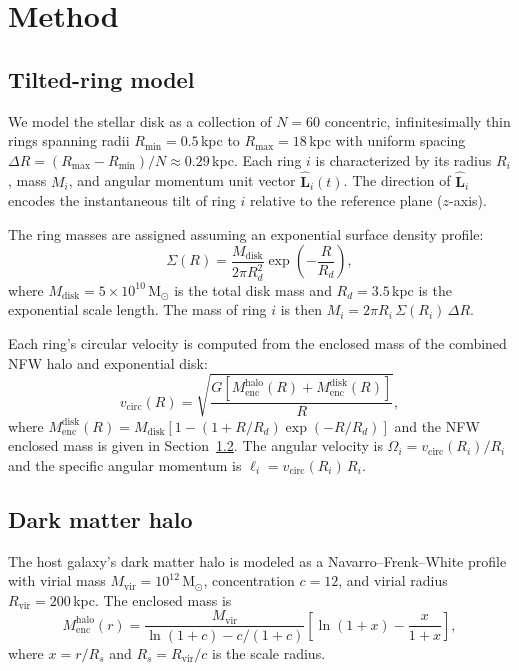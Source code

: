 \section{Method}
\label{sec:method}

\subsection{Tilted-ring model}
\label{sec:ring_model}

We model the stellar disk as a collection of $N=60$ concentric, infinitesimally thin rings spanning radii $R_\mathrm{min}=0.5$\,kpc to $R_\mathrm{max}=18$\,kpc with uniform spacing $\Delta R = (R_\mathrm{max}-R_\mathrm{min})/N \approx 0.29$\,kpc. Each ring $i$ is characterized by its radius $R_i$, mass $M_i$, and angular momentum unit vector $\hat{\boldsymbol{L}}_i(t)$. The direction of $\hat{\boldsymbol{L}}_i$ encodes the instantaneous tilt of ring $i$ relative to the reference plane ($z$-axis).

The ring masses are assigned assuming an exponential surface density profile:
\begin{equation}
    \Sigma(R) = \frac{M_\mathrm{disk}}{2\pi R_d^2} \exp\!\left(-\frac{R}{R_d}\right),
\end{equation}
where $M_\mathrm{disk}=5\times10^{10}\,\mathrm{M}_\odot$ is the total disk mass and $R_d=3.5$\,kpc is the exponential scale length. The mass of ring $i$ is then $M_i = 2\pi R_i \,\Sigma(R_i)\,\Delta R$.

Each ring's circular velocity is computed from the enclosed mass of the combined NFW halo and exponential disk:
\begin{equation}
    v_\mathrm{circ}(R) = \sqrt{\frac{G\left[M_\mathrm{enc}^\mathrm{halo}(R) + M_\mathrm{enc}^\mathrm{disk}(R)\right]}{R}},
\end{equation}
where $M_\mathrm{enc}^\mathrm{disk}(R) = M_\mathrm{disk}\left[1-(1+R/R_d)\exp(-R/R_d)\right]$ and the NFW enclosed mass is given in Section~\ref{sec:halo}. The angular velocity is $\Omega_i = v_\mathrm{circ}(R_i)/R_i$ and the specific angular momentum is $\ell_i = v_\mathrm{circ}(R_i)\,R_i$.

\subsection{Dark matter halo}
\label{sec:halo}

The host galaxy's dark matter halo is modeled as a Navarro--Frenk--White \citep[NFW;][]{navarro1996} profile with virial mass $M_\mathrm{vir}=10^{12}\,\mathrm{M}_\odot$, concentration $c=12$, and virial radius $R_\mathrm{vir}=200$\,kpc. The enclosed mass is
\begin{equation}
    M_\mathrm{enc}^\mathrm{halo}(r) = \frac{M_\mathrm{vir}}{\ln(1+c) - c/(1+c)} \left[\ln(1+x) - \frac{x}{1+x}\right],
\end{equation}
where $x = r/R_s$ and $R_s = R_\mathrm{vir}/c$ is the scale radius.

